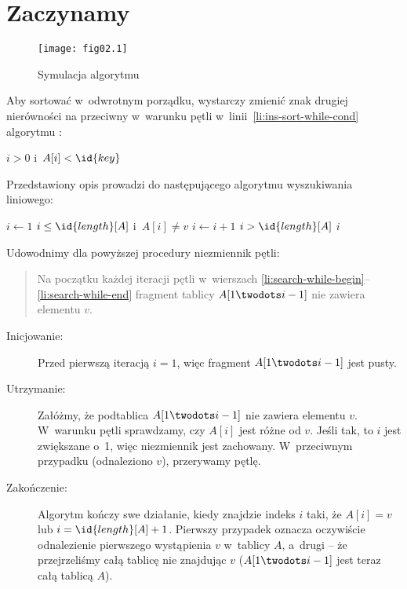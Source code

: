\chapter{Zaczynamy}


\exercise %
\begin{figure}[!h]
	\begin{center}
		\texttt{[image: fig02.1]}
	\end{center}
	\caption{Symulacja algorytmu } \label{fig.2.1-1}
\end{figure}

\exercise %
Aby sortować w~odwrotnym porządku, wystarczy zmienić znak drugiej nierówności na przeciwny w~warunku pętli  w~linii~\ref{li:ins-sort-while-cond} algorytmu :
\begin{codebox}
\setcounter{codelinenumber}{4}
\li	\While $i>0$ i~$A[i]<\id{key}$
\end{codebox}

\exercise %
Przedstawiony opis prowadzi do następującego algorytmu wyszukiwania liniowego:
\begin{codebox}
\li	$i\gets 1$
\li	\While $i\le\id{length}[A]$ i~$A[i]\ne v$ \label{li:search-while-begin}
\li		\Do
			$i\gets i+1$
		\End \label{li:search-while-end}
\li	\If $i>\id{length}[A]$
\li		\Then \label{li:ins-sort-while-cond}
			\Return {}
\li		\Else
			\Return $i$
		\End
\end{codebox}
Udowodnimy dla powyższej procedury niezmiennik pętli:
\begin{quote}
Na początku każdej iteracji pętli  w~wierszach \ref{li:search-while-begin}\nobreakdash--\ref{li:search-while-end} fragment tablicy $A[1\twodots i-1]$ nie zawiera elementu $v$.
\end{quote}
\begin{description}
	\item[Inicjowanie:] Przed pierwszą iteracją $i=1$, więc fragment $A[1\twodots i-1]$ jest pusty.
	\item[Utrzymanie:] Załóżmy, że podtablica $A[1\twodots i-1]$ nie zawiera elementu $v$. W~warunku pętli  sprawdzamy, czy $A[i]$ jest różne od $v$. Jeśli tak, to $i$ jest zwiększane o~1, więc niezmiennik jest zachowany. W~przeciwnym przypadku (odnaleziono $v$), przerywamy pętlę.
	\item[Zakończenie:] Algorytm kończy swe działanie, kiedy znajdzie indeks $i$ taki, że $A[i]=v$ lub $i=\id{length}[A]+1$. Pierwszy przypadek oznacza oczywiście odnalezienie pierwszego wystąpienia $v$ w~tablicy $A$, a~drugi -- że przejrzeliśmy całą tablicę nie znajdując $v$ ($A[1\twodots i-1]$ jest teraz całą tablicą $A$).
\end{description}

